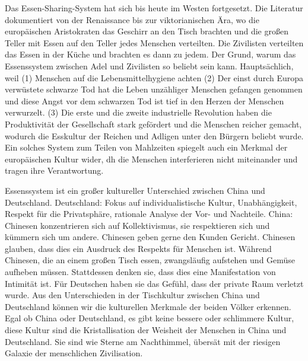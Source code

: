 \mypar
Das Essen-Sharing-System hat sich bis heute im Westen fortgesetzt. Die Literatur dokumentiert von der Renaissance bis zur viktorianischen Ära, wo die europäischen Aristokraten das Geschirr an den Tisch brachten und die gro\ss en Teller mit Essen auf den Teller jedes Menschen verteilten. Die Zivilisten verteilten das Essen in der Küche und brachten es dann zu jedem. Der Grund, warum das Essenssystem zwischen Adel und Zivilisten so beliebt sein kann. Hauptsächlich, weil (1)  Menschen auf die Lebensmittelhygiene achten (2) Der einst durch Europa verwüstete schwarze Tod hat die Leben unzähliger Menschen gefangen genommen und diese Angst vor dem schwarzen Tod ist tief in den Herzen der Menschen verwurzelt. (3) Die erste und die zweite industrielle Revolution haben die Produktivität der Gesellschaft stark gefördert und die Menschen reicher gemacht, wodurch die Esskultur der Reichen und Adligen unter den Bürgern beliebt wurde. Ein solches System zum Teilen von Mahlzeiten spiegelt auch ein Merkmal der europäischen Kultur wider, dh die Menschen interferieren nicht miteinander und tragen ihre Verantwortung.

\mypar
Essenssystem ist ein gro\ss er kultureller Unterschied zwischen China und Deutschland. Deutschland: Fokus auf individualistische Kultur, Unabhängigkeit, Respekt für die Privatsphäre, rationale Analyse der Vor- und Nachteile. China: Chinesen konzentrieren sich auf Kollektivismus, sie respektieren sich und kümmern sich um andere. Chinesen geben gerne den Kunden Gericht. Chinesen glauben, dass dies ein Ausdruck des Respekts für Menschen ist. Während Chinesen, die an einem gro\ss en Tisch essen, zwangsläufig aufstehen und Gemüse aufheben müssen. Stattdessen denken sie, dass dies eine Manifestation von Intimität ist. Für Deutschen haben sie das Gefühl, dass der private Raum verletzt wurde.
Aus den Unterschieden in der Tischkultur zwischen China und Deutschland können wir die kulturellen Merkmale der beiden Völker erkennen. Egal ob China oder Deutschland, es gibt keine bessere oder schlimmere Kultur, diese Kultur sind die Kristallisation der Weisheit der Menschen in China und Deutschland. Sie sind wie Sterne am Nachthimmel, übersät mit der riesigen Galaxie der menschlichen Zivilisation.